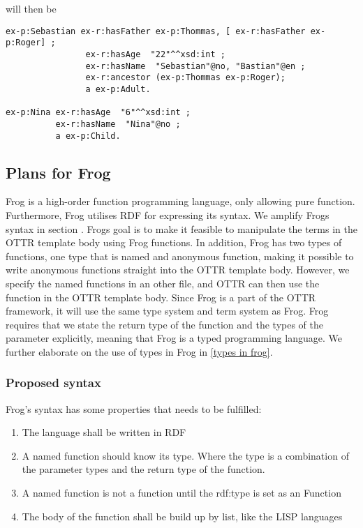 will then be
\begin{lstlisting}[frame=single, language=turtle]
ex-p:Sebastian ex-r:hasFather ex-p:Thommas, [ ex-r:hasFather ex-p:Roger] ; 
                ex-r:hasAge  "22"^^xsd:int ; 
                ex-r:hasName  "Sebastian"@no, "Bastian"@en ;
                ex-r:ancestor (ex-p:Thommas ex-p:Roger);
                a ex-p:Adult.

ex-p:Nina ex-r:hasAge  "6"^^xsd:int ; 
          ex-r:hasName  "Nina"@no ;
          a ex-p:Child.
\end{lstlisting}

\subsection{Plans for Frog}
Frog is a high-order function programming language, only allowing pure function. Furthermore, Frog utilises RDF for expressing its syntax. We amplify Frogs syntax in section \label{frog syntax}. Frogs goal is to make it feasible to manipulate the terms in the OTTR template body using Frog functions. In addition, Frog has two types of functions, one type that is named and anonymous function, making it possible to write anonymous functions straight into the OTTR template body. However, we specify the named functions in an other file, and OTTR can then use the function in the OTTR template body. Since Frog is a part of the OTTR framework, it will use the same type system and term system as Frog. Frog requires that we state the return type of the function and the types of the parameter explicitly, meaning that Frog is a typed programming language. We further elaborate on the use of types in Frog in \autoref{types in frog}.

\subsubsection{Proposed syntax}
\label{frog syntax}
Frog's syntax has some properties that needs to be fulfilled: 
\begin{enumerate}
    \item The language shall be written in RDF 
    \item A named function should know its type. Where the type is a combination of the parameter types 
    and the return type of the function.
    \item A named function is not a function until the rdf:type is set as an Function
    \item The body of the function shall be build up by list, like the LISP languages
\end{enumerate}

